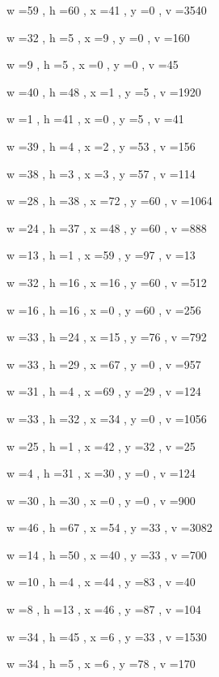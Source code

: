 \documentclass[11pt]{article}
\begin{document}
w =59 , h =60 , x =41 , y =0 , v =3540
\par
w =32 , h =5 , x =9 , y =0 , v =160
\par
w =9 , h =5 , x =0 , y =0 , v =45
\par
w =40 , h =48 , x =1 , y =5 , v =1920
\par
w =1 , h =41 , x =0 , y =5 , v =41
\par
w =39 , h =4 , x =2 , y =53 , v =156
\par
w =38 , h =3 , x =3 , y =57 , v =114
\par
w =28 , h =38 , x =72 , y =60 , v =1064
\par
w =24 , h =37 , x =48 , y =60 , v =888
\par
w =13 , h =1 , x =59 , y =97 , v =13
\par
w =32 , h =16 , x =16 , y =60 , v =512
\par
w =16 , h =16 , x =0 , y =60 , v =256
\par
w =33 , h =24 , x =15 , y =76 , v =792
\par
\newpage




w =33 , h =29 , x =67 , y =0 , v =957
\par
w =31 , h =4 , x =69 , y =29 , v =124
\par
w =33 , h =32 , x =34 , y =0 , v =1056
\par
w =25 , h =1 , x =42 , y =32 , v =25
\par
w =4 , h =31 , x =30 , y =0 , v =124
\par
w =30 , h =30 , x =0 , y =0 , v =900
\par
w =46 , h =67 , x =54 , y =33 , v =3082
\par
w =14 , h =50 , x =40 , y =33 , v =700
\par
w =10 , h =4 , x =44 , y =83 , v =40
\par
w =8 , h =13 , x =46 , y =87 , v =104
\par
w =34 , h =45 , x =6 , y =33 , v =1530
\par
w =34 , h =5 , x =6 , y =78 , v =170
\par
\newpage
\end{document}
